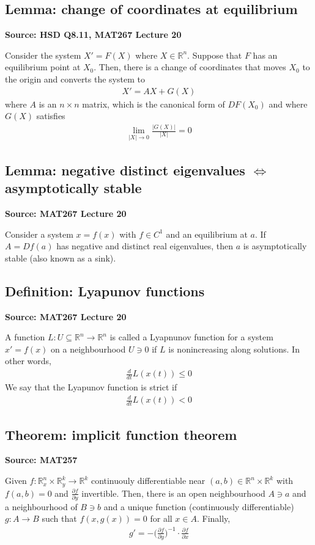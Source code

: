 \documentclass[11pt]{article}
\newcommand{\R}{\mathbb{R}}
\begin{document}
\subsection{Lemma: change of coordinates at equilibrium}
\textbf{Source: HSD Q8.11, MAT267 Lecture 20}

Consider the system $X' = F(X)$ where $X \in \R^n$. Suppose that $F$ has an equilibrium point at $X_0$. Then, there is a change of coordinates that moves $X_0$ to the origin and converts the system to 
\begin{align*}
    X' = AX + G(X)
\end{align*}
where $A$ is an $n \times n$ matrix, which is the canonical form of $DF(X_0)$ and where $G(X)$ satisfies 
\begin{align*}
    \lim_{|X| \to 0} \frac{|G(X)|}{|X|} = 0
\end{align*}

\subsection{Lemma: negative distinct eigenvalues $\Longleftrightarrow$ asymptotically stable}
\textbf{Source: MAT267 Lecture 20}

Consider a system $x = f(x)$ with $f \in C^1$ and an equilibrium at $a$. If $A = Df(a)$ has negative and distinct real eigenvalues, then $a$ is asymptotically stable (also known as a sink). 

\subsection{Definition: Lyapunov functions}
\textbf{Source: MAT267 Lecture 20}

A function $L: U \subseteq \R^n \to \R^n$ is called a Lyapnunov function for a system $x' = f(x)$ on a neighbourhood $U \ni 0$ if $L$ is nonincreasing along solutions. In other words,
\begin{align*}
    \frac{d}{dt}L(x(t)) \leq 0 
\end{align*}
We say that the Lyapunov function is strict if 
\begin{align*}
    \frac{d}{dt}L(x(t)) < 0 
\end{align*}

\subsection{Theorem: implicit function theorem}
\textbf{Source: MAT257}

Given $f: \mathbb{R}^n_x \times \mathbb{R}^k_y \to \mathbb{R}^k$ continuouly differentiable near $(a,b) \in \mathbb{R}^n \times \mathbb{R}^k$ with $f(a,b) = 0 $ and $\frac{\partial f}{\partial y}$ invertible. Then, there is an open neighbourhood $A \ni a$ and a neighbourhood of $B \ni b$ and a unique function (continuously differentiable) $g: A \to B$ such that $f(x,g(x)) = 0$ for all $x \in A$. Finally, 
\begin{align*}
    g' = - \bigg(\frac{\partial f}{\partial y}\bigg)^{-1} \cdot \frac{\partial f}{\partial x}
\end{align*} 
\end{document}
